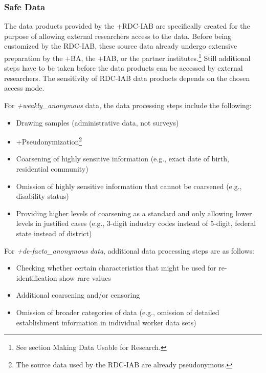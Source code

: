 \documentclass[
]{WileySix}
\providecommand{\tightlist}{%
  \setlength{\itemsep}{0pt}\setlength{\parskip}{0pt}}
\begin{document}
\hypertarget{safe-data}{%
\subsubsection{Safe Data}\label{safe-data}}

The data products provided by the +RDC-IAB\textbar{} are specifically created for the purpose of allowing external researchers access to the data. Before being customized by the RDC-IAB, these source data already undergo extensive preparation by the +BA\textbar, the +IAB\textbar, or the partner institutes.\footnote{See section Making Data Usable for Research.} Still additional steps have to be taken before the data products can be accessed by external researchers. The sensitivity of RDC-IAB data products depends on the chosen access mode.

For \emph{+weakly\_anonymous\textbar{}} data, the data processing steps include the following:

\begin{itemize}
\tightlist
\item
  Drawing samples (administrative data, not surveys)
\item
  +Pseudonymization\textbar{}\footnote{The source data used by the RDC-IAB are already pseudonymous.}
\item
  Coarsening of highly sensitive information (e.g., exact date of birth, residential community)
\item
  Omission of highly sensitive information that cannot be coarsened (e.g., disability status)
\item
  Providing higher levels of coarsening as a standard and only allowing lower levels in justified cases (e.g., 3-digit industry codes instead of 5-digit, federal state instead of district)
\end{itemize}

For \emph{+de-facto\_anonymous\textbar{}} \emph{data}, additional data processing steps are as follows:

\begin{itemize}
\tightlist
\item
  Checking whether certain characteristics that might be used for re-identification show rare values
\item
  Additional coarsening and/or censoring
\item
  Omission of broader categories of data (e.g., omission of detailed establishment information in individual worker data sets)
\end{itemize}
\end{document}
